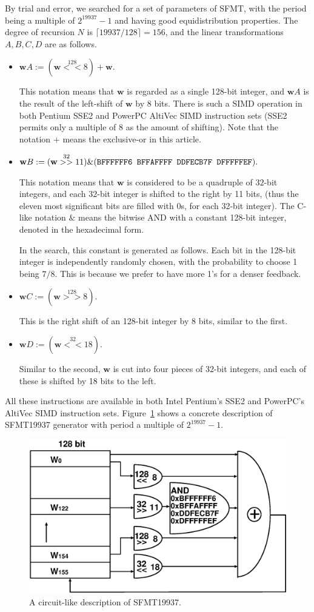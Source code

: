 \documentclass{svmult}
\def\bw{{{\mathbf w}}}
\begin{document}
By trial and error, 
we searched for a set of parameters of SFMT,
with the period being a multiple of $2^{19937}-1$
and having good equidistribution properties.
The degree of recursion $N$ is $\lceil 19937/128 \rceil=156$, 
and the linear transformations $A,B,C,D$ are as follows.
\begin{itemize}
\item 
$\bw A := (\bw \stackrel{128}{<<} 8) + \bw.$

This notation means that $\bw$ is regarded
as a single 128-bit integer, and 
$\bw A$ is the result of the left-shift
of $\bw$ by 8 bits. There is such a SIMD operation
in both Pentium SSE2 and PowerPC AltiVec SIMD instruction 
sets (SSE2 permits only a multiple of 8
as the amount of shifting). 
Note that the notation $+$ means the exclusive-or
in this article.

\item
$\bw B := (\bw \stackrel{32}{>>} 11) \& (\mbox{\tt BFFFFFF6 BFFAFFFF DDFECB7F DFFFFFEF}).$

This notation means that $\bw$ is considered to be 
a quadruple of $32$-bit integers, and
each $32$-bit integer is shifted to the right by 11 bits,
(thus the eleven most significant bits are filled with 0s, 
for each 32-bit integer).
The C-like notation $\&$ means the bitwise AND
with a constant 128-bit integer,
denoted in the hexadecimal form.

In the search,
this constant is generated as follows. 
Each bit in the 128-bit integer is independently 
randomly chosen, with the probability to choose 1 being $7/8$.
This is because we prefer to have more 1's for a denser 
feedback.

\item 
$\bw C := (\bw \stackrel{128}{>>} 8).$

This is the right shift of 
an 128-bit integer
by 8 bits, similar to the first.

\item
$\bw D := (\bw \stackrel{32}{<<} 18).$

Similar to the second,
$\bw$ is cut into four pieces of 32-bit integers,
and each of these is shifted by 18 bits to the left.
\end{itemize}
All these instructions are available in 
both Intel Pentium's SSE2 and PowerPC's AltiVec SIMD instruction sets.
Figure~\ref{fig:SFMT-B2} shows a concrete description
of SFMT19937 generator with period a multiple of $2^{19937}-1$.
\begin{figure}
\begin{center}
\includegraphics[width=0.6\linewidth]{sfmt-b2.eps}
\end{center}
\caption{A circuit-like description of SFMT19937.}
\label{fig:SFMT-B2}
\end{figure}
\end{document}
